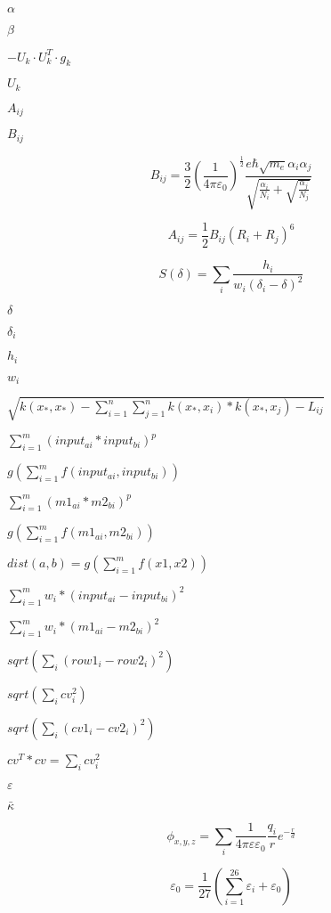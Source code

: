 \documentclass{article}
\begin{document}
$\alpha$
\pagebreak

$\beta$
\pagebreak

$-U_k \cdot U_k^T \cdot g_k$
\pagebreak

$U_k$
\pagebreak

$A_{ij}$
\pagebreak

$B_{ij}$
\pagebreak

\[ B_{ij} = \frac{3}{2} \left(\frac{1}{4 \pi \varepsilon_0}\right)^\frac{1}{2} \frac{e \hbar \sqrt{m_e} \alpha_i \alpha_j}{\sqrt{\frac{\alpha_i}{N_i} + \sqrt{\frac{\alpha_j}{N_j}}}} \]
\pagebreak

\[ A_{ij} = \frac{1}2{} B_{ij} (R_i + R_j)^6 \]
\pagebreak

\[ S(\delta) = \sum_{i} \frac{h_i}{w_i (\delta_i-\delta)^2} \]
\pagebreak

$\delta$
\pagebreak

$\delta_i$
\pagebreak

$h_i$
\pagebreak

$w_i$
\pagebreak

$ \sqrt{k(x_*,x_*)-\sum_{i=1}^n \sum_{j=1}^n k(x_*,x_i)*k(x_*,x_j)-L_{ij} } $
\pagebreak

$ \sum_{i=1}^m (input_{ai} * input_{bi})^p $
\pagebreak

$ g(\sum_{i=1}^m f(input_{ai}, input_{bi})) $
\pagebreak

$ \sum_{i=1}^m (m1_{ai} * m2_{bi})^p $
\pagebreak

$ g(\sum_{i=1}^m f(m1_{ai}, m2_{bi})) $
\pagebreak

$ dist(a,b)= g(\sum_{i=1}^m f(x1,x2)) $
\pagebreak

$ \sum_{i=1}^m w_i * (input_{ai}- input_{bi})^2 $
\pagebreak

$ \sum_{i=1}^m w_i * (m1_{ai}- m2_{bi})^2 $
\pagebreak

$ sqrt(\sum_i (row1_i-row2_i)^2) $
\pagebreak

$ sqrt(\sum_i cv_i^2) $
\pagebreak

$ sqrt(\sum_i (cv1_i-cv2_i)^2) $
\pagebreak

$ cv^T*cv = \sum_i cv_i^2 $
\pagebreak

$\varepsilon$
\pagebreak

$\bar{\kappa}$
\pagebreak

\[ \phi_{x,y,z} = \sum_i \frac{1}{4 \pi \varepsilon \varepsilon_0} \frac{q_i}{r} e^{-\frac{r}{d}} \]
\pagebreak

\[ \varepsilon_0 = \frac{1}{27} \left( \sum_{i=1}^{26} \varepsilon_i + \varepsilon_0 \right) \]
\pagebreak
\end{document}
